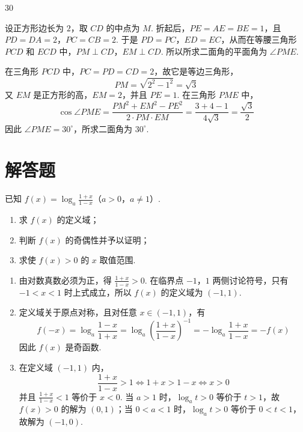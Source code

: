 \begin{answer}
30
\end{answer}

\begin{solution}
设正方形边长为 \(2\)，取 \(CD\) 的中点为 \(M\). 折起后，\(PE=AE=BE=1\)，且
\(PD=DA=2\)，\(PC=CB=2\).
于是 \(PD=PC\)，\(ED=EC\)，从而在等腰三角形 \(PCD\) 和 \(ECD\) 中，\(PM\perp CD\)，\(EM\perp CD\). 所以所求二面角的平面角为 \(\angle PME\).

在三角形 \(PCD\) 中，\(PC=PD=CD=2\)，故它是等边三角形，
\[
PM=\sqrt{2^2-1^2}=\sqrt3
\]
又 \(EM\) 是正方形的高，\(EM=2\)，并且 \(PE=1\). 在三角形 \(PME\) 中，
\[
\cos\angle PME
=\frac{PM^2+EM^2-PE^2}{2\cdot PM\cdot EM}
=\frac{3+4-1}{4\sqrt3}
=\frac{\sqrt3}{2}
\]
因此 \(\angle PME=30^\circ\)，所求二面角为 \(30^\circ\).
\end{solution}

\section{解答题}

\begin{problem}
已知 \(f(x)=\log_a\frac{1+x}{1-x}\)（\(a>0\)，\(a\neq 1\)）.

\begin{enumerate}
\item 求 \(f(x)\) 的定义域；
\item 判断 \(f(x)\) 的奇偶性并予以证明；
\item 求使 \(f(x)>0\) 的 \(x\) 取值范围.
\end{enumerate}
\end{problem}

\begin{solution}
\begin{enumerate}
\item 由对数真数必须为正，得 \(\frac{1+x}{1-x}>0\).
在临界点 \(-1\)，\(1\) 两侧讨论符号，只有 \(-1<x<1\) 时上式成立，所以 \(f(x)\) 的定义域为 \((-1,1)\).

\item 定义域关于原点对称，且对任意 \(x\in(-1,1)\)，有
\[
f(-x)=\log_a\frac{1-x}{1+x}=\log_a\left(\frac{1+x}{1-x}\right)^{-1}=-\log_a\frac{1+x}{1-x}=-f(x)
\]
因此 \(f(x)\) 是奇函数.

\item 在定义域 \((-1,1)\) 内，
\[
\frac{1+x}{1-x}>1\Longleftrightarrow 1+x>1-x\Longleftrightarrow x>0
\]
并且 \(\frac{1+x}{1-x}<1\) 等价于 \(x<0\). 当 \(a>1\) 时，\(\log_a t>0\) 等价于 \(t>1\)，故 \(f(x)>0\) 的解为 \((0,1)\)；当 \(0<a<1\) 时，\(\log_a t>0\) 等价于 \(0<t<1\)，故解为 \((-1,0)\).
\end{enumerate}
\end{solution}


